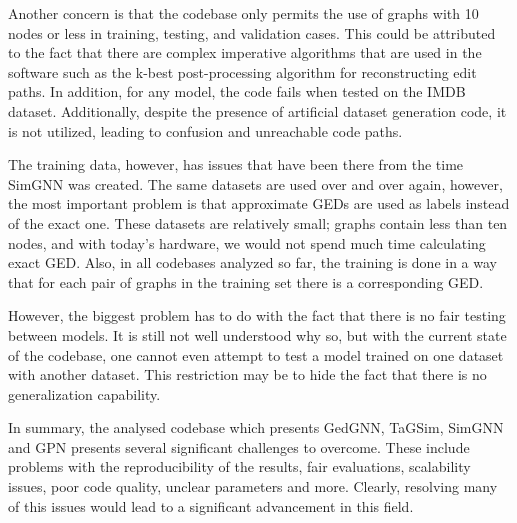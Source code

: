 \documentclass[../Thesis.tex]{subfiles}
\begin{document}
	Another concern is that the codebase only permits the use of graphs with 10 nodes or less in training, testing, and validation cases. This could be attributed to the fact that there are complex imperative algorithms that are used in the software such as the k-best post-processing algorithm for reconstructing edit paths. In addition, for any model, the code fails when tested on the IMDB dataset. Additionally, despite the presence of artificial dataset generation code, it is not utilized, leading to confusion and unreachable code paths.

	The training data, however, has issues that have been there from the time SimGNN was created. The same datasets are used over and over again, however, the most important problem is that approximate GEDs are used as labels instead of the exact one. These datasets are relatively small; graphs contain less than ten nodes, and with today’s hardware, we would not spend much time calculating exact GED. Also, in all codebases analyzed so far, the training is done in a way that for each pair of graphs in the training set there is a corresponding GED.
	
	However, the biggest problem has to do with the fact that there is no fair testing between models. It is still not well understood why so, but with the current state of the codebase, one cannot even attempt to test a model trained on one dataset with another dataset. This restriction may be to hide the fact that there is no generalization capability.
	
	In summary, the analysed codebase which presents GedGNN, TaGSim, SimGNN and GPN presents several significant challenges to overcome. These include problems with the reproducibility of the results, fair evaluations, scalability issues, poor code quality, unclear parameters and more. Clearly, resolving many of this issues would lead to a significant advancement in this field.
	
\end{document}
